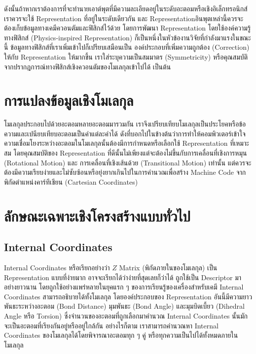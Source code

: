 ดังนั้นถ้าหากเราต้องการที่จะทำนายเอาต์พุตที่มีความละเอียดอยู่ในระดับอะตอมหรือเชิงอิเล็กทรอนิกส์ เราควรจะใช้ Representation ที่อยู่ในระดับเดียวกัน 
และ Representationอินพุตเหล่านี้ควรจะต้องเก็บข้อมูลทางเคมีควอนตัมและฟิสิกส์ไว้ด้วย โดยการพัฒนา Representation โดยใช้องค์ความรู้ทางฟิสิกส์
(Physics-inspired Representation) ก็เป็นหนึ่งในหัวข้องานวิจัยที่กำลังมาแรงในขณะนี้ ข้อมูลทางฟิสิกส์ที่เราเพิ่มเข้าไปก็เปรียบเสมือนเป็น%
องค์ประกอบที่เพิ่มความถูกต้อง (Correction) ให้กับ Representation ให้มากขึ้น เราใส่ระบุความเป็นสมมาตร (Symmetricity) หรือคุณสมบัติ%
จากปรากฎการณ์ทางฟิสิกส์เชิงควอนตัมของโมเลกุลเข้าไปได้ เป็นต้น 

\section{การแปลงข้อมูลเชิงโมเลกุล}

โมเลกุลประกอบไปด้วยอะตอมหลายอะตอมมารวมกัน เราจึงเปรียบเทียบโมเลกุลเป็นประโยคหรือข้อความและเปนียบเทียบอะตอมเป็นคำแต่ละคำได้
ดังที่บอกไปในข้างต้นว่าการทำให้คอมพิวเตอร์เข้าใจความเชื่อมโยงระหว่างอะตอมในโมเลกุลนั้นต้องมีการกำหนดหรือเลือกใช้ Representation ที่เหมาะสม
โดยคุณสมบัติของ Representation ที่ดีนั้นไม่เพียงแต่จะต้องไม่ขึ้นกับการเคลื่อนที่เชิงการหมุน (Rotational Motion) และ การเคลื่อนที่เชิงเส้นด้วย 
(Transitional Motion) เท่านั้น แต่ควรจะต้องมีความเรียบง่ายและไม่ซับซ้อนหรือยุ่งยากเกินไปในการคำนวณเพื่อสร้าง Machine Code 
จากพิกัดตำแหน่งคาร์ทีเชียน (Cartesian Coordinates)

\section{ลักษณะเฉพาะเชิงโครงสร้างแบบทั่วไป}

\subsection{Internal Coordinates}

Internal Coordinates หรือเรียกอย่างว่า $Z$ Matrix (พิกัดภายในของโมเลกุล) เป็น Representation แบบที่ง่ายมาก 
อาจจะเรียกได้ว่าง่ายที่สุดเลยก็ว่าได้ ถูกใช้เป็น Descriptor มาอย่างยาวนาน โดยถูกใช้อย่างแพร่หลายในยุคแรก ๆ ของการเรียนรู้ของเครื่องสำหรับเคมี
Internal Coordinates สามารถอธิบายได้ทั้งโมเลกุล โดยองค์ประกอบของ Representation อันนี้มีความยาวพันธะระหว่างอะตอม (Bond Distance) 
มุมพันธะ (Bond Angle) และมุมบิดเบี้ยว (Dihedral Angle หรือ Torsion) ซึ่งจำนวนของอะตอมที่ถูกเลือกมาคำนวณ Internal Coordinates 
นั้นมักจะเป็นอะตอมที่เรียงกันอยู่หรืออยู่ใกล้กัน อย่างไรก็ตาม เราสามารถคำนวณหา Internal Coordinates ของโมเลกุลได้โดยพิจารณาอะตอมทุก ๆ คู่
หรือทุกความเป็นไปได้ทั้งหมดภายในโมเลกุล


